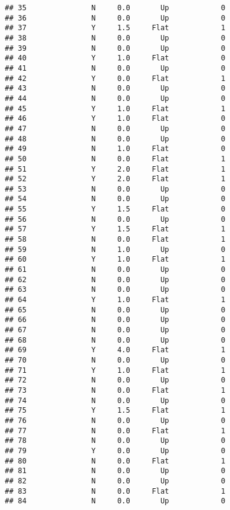 \documentclass[
]{article}
\begin{document}
\begin{verbatim}
## 35               N     0.0       Up            0
## 36               N     0.0       Up            0
## 37               Y     1.5     Flat            1
## 38               N     0.0       Up            0
## 39               N     0.0       Up            0
## 40               Y     1.0     Flat            0
## 41               N     0.0       Up            0
## 42               Y     0.0     Flat            1
## 43               N     0.0       Up            0
## 44               N     0.0       Up            0
## 45               Y     1.0     Flat            1
## 46               Y     1.0     Flat            0
## 47               N     0.0       Up            0
## 48               N     0.0       Up            0
## 49               N     1.0     Flat            0
## 50               N     0.0     Flat            1
## 51               Y     2.0     Flat            1
## 52               Y     2.0     Flat            1
## 53               N     0.0       Up            0
## 54               N     0.0       Up            0
## 55               Y     1.5     Flat            0
## 56               N     0.0       Up            0
## 57               Y     1.5     Flat            1
## 58               N     0.0     Flat            1
## 59               N     1.0       Up            0
## 60               Y     1.0     Flat            1
## 61               N     0.0       Up            0
## 62               N     0.0       Up            0
## 63               N     0.0       Up            0
## 64               Y     1.0     Flat            1
## 65               N     0.0       Up            0
## 66               N     0.0       Up            0
## 67               N     0.0       Up            0
## 68               N     0.0       Up            0
## 69               Y     4.0     Flat            1
## 70               N     0.0       Up            0
## 71               Y     1.0     Flat            1
## 72               N     0.0       Up            0
## 73               N     0.0     Flat            1
## 74               N     0.0       Up            0
## 75               Y     1.5     Flat            1
## 76               N     0.0       Up            0
## 77               N     0.0     Flat            1
## 78               N     0.0       Up            0
## 79               Y     0.0       Up            0
## 80               N     0.0     Flat            1
## 81               N     0.0       Up            0
## 82               N     0.0       Up            0
## 83               N     0.0     Flat            1
## 84               N     0.0       Up            0

\end{verbatim}
\end{document}
